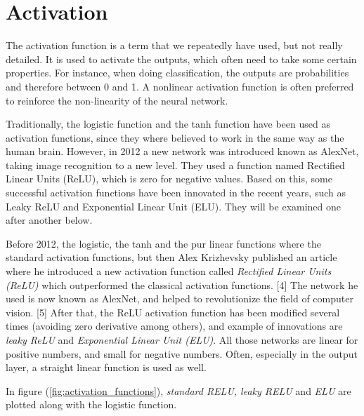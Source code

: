 \section{Activation} \label{sec:activation}
The activation function is a term that we repeatedly have used, but not really detailed. It is used to activate the outputs, which often need to take some certain properties. For instance, when doing classification, the outputs are probabilities and therefore between 0 and 1. A nonlinear activation function is often preferred to reinforce the non-linearity of the neural network. 

Traditionally, the logistic function and the tanh function have been used as activation functions, since they where believed to work in the same way as the human brain. However, in 2012 a new network was introduced known as AlexNet, taking image recognition to a new level. They used a function named Rectified Linear Units (ReLU), which is zero for negative values. Based on this, some successful activation functions have been innovated in the recent years, such as Leaky ReLU and Exponential Linear Unit (ELU). They will be examined one after another below. 

Before 2012, the logistic, the tanh and the pur linear functions where the standard activation functions, but then Alex Krizhevsky published an article where he introduced a new activation function called \textit{Rectified Linear Units (ReLU)} which outperformed the classical activation functions. [4] The network he used is now known as AlexNet, and helped to revolutionize the field of computer vision. [5] After that, the ReLU activation function has been modified several times (avoiding zero derivative among others), and example of innovations are \textit{leaky ReLU} and \textit{Exponential Linear Unit (ELU)}. All those networks are linear for positive numbers, and small for negative numbers. Often, especially in the output layer, a straight linear function is used as well.

In figure (\ref{fig:activation_functions}), \textit{standard RELU, leaky RELU} and \textit{ELU} are plotted along with the logistic function.

